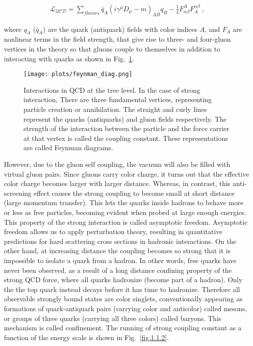 \begin{equation}
    \label{eq.1.1}
    \begin{aligned}
        \mathcal{L_{QCD}}=\sum_{flavors}\bar{q}_{A}(i\gamma^{\mu}D_{\mu}-m)_{AB}q_{B}-\frac{1}{4}F^{A}_{\alpha\beta}F^{\alpha\beta}_{A}~,
    \end{aligned}
\end{equation}

\noindent where $q_A$ ($\bar{q}_{A}$) are the quark (antiquark) fields with color indices $A$, and $F_{A}$ are nonlinear terms in the field strength, that give rise to three- and four-gluon vertices in the theory so that gluons couple to themselves in addition to interacting with quarks as shown in Fig.~\ref{fig.1.1.1}.

\begin{figure}[H]
    \centering
        \texttt{[image: plots/feynman\_diag.png]}
        \caption{Interactions in QCD at the tree level. In the case of strong interaction, There are three fundamental vertices, representing particle creation or annihilation. The straight and curly lines represent the quarks (antiquarks) and gluon fields respectively. The strength of the interaction between the particle and the force carrier at that vertex is called the coupling constant. These representations are called Feynman diagrams.}
        \label{fig.1.1.1}
\end{figure}

However, due to the gluon self coupling, the vacuum will also be filled with virtual gluon pairs. Since gluons carry color charge, it turns out that the effective color charge becomes larger with larger distance. Whereas, in contrast, this anti-screening effect causes the strong coupling to become small at short distance (large momentum transfer). This lets the quarks inside hadrons to behave more or less as free particles, becoming evident when probed at large enough energies. This property of the strong interaction is called asymptotic freedom. Asymptotic freedom allows us to apply perturbation theory, resulting in quantitative predictions for hard scattering cross sections in hadronic interactions. On the other hand, at increasing distance the coupling becomes so strong that it is impossible to isolate a quark from a hadron. In other words, free quarks have never been observed, as a result of a long distance confining property of the strong QCD force, where all quarks hadronize (become part of a hadron). Only the the top quark instead decays before it has time to hadronize. Therefore all observable strongly bound states are color singlets, conventionally appearing as formations of quark-antiquark pairs (carrying color and anticolor) called mesons, or groups of three quarks (carrying all three colors) called baryons. This mechanism is called confinement. The running of strong coupling constant as a function of the energy scale is shown in Fig.~\ref{fig.1.1.2}.

